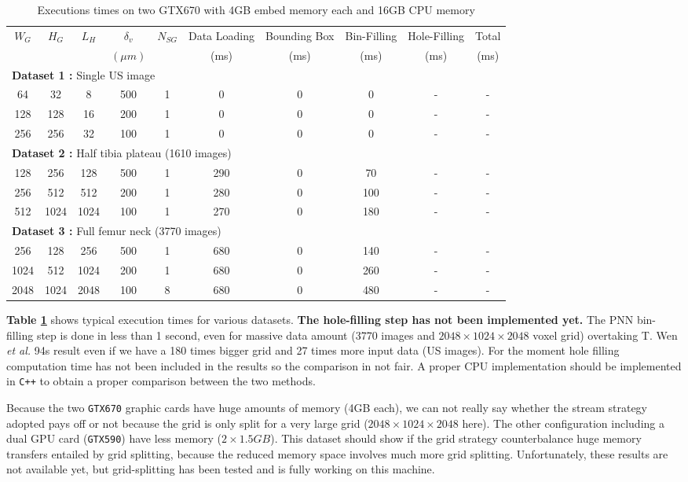 \documentclass[12pt,journal,compsoc]{IEEEtran}
\begin{document}
\begin{table}[!ht]
\renewcommand{\arraystretch}{1.3}
\caption{Executions times on two GTX670 with 4GB embed memory each and 16GB CPU memory}
\label{results_gtx670}
\centering
\begin{tabular}{|c|c|c||c|c||c|c|c|c||c|}
\hline
$W_G$ & $H_G$ & $L_H$ & $\delta_v$ & $N_{SG}$ & Data Loading & Bounding Box & Bin-Filling & Hole-Filling & Total \\
      &&&$(\mu m)$&&(ms)&(ms)&(ms)&(ms)&(ms)\\
\hline
\multicolumn{10}{|l|}{\textbf{Dataset 1 :} Single US image}\\
\hline
64&32&8&500&1&0&0&0&-&-\\
\hline
128&128&16&200&1&0&0&0&-&-\\
\hline
256&256&32&100&1&0&0&0&-&-\\
\hline
\hline
\multicolumn{10}{|l|}{\textbf{Dataset 2 :} Half tibia plateau (1610 images)}\\
\hline
128&256&128&500&1&290&0&70&-&-\\
\hline
256&512&512&200&1&280&0&100&-&-\\
\hline
512&1024&1024&100&1&270&0&180&-&-\\
\hline
\hline
\multicolumn{10}{|l|}{\textbf{Dataset 3 :} Full femur neck (3770 images)}\\
\hline
256&128&256&500&1&680&0&140&-&-\\
\hline
1024&512&1024&200&1&680&0&260&-&-\\
\hline
2048&1024&2048&100&8&680&0&480&-&-\\
\hline
\end{tabular}
\end{table}

\textbf{Table \ref{results_gtx670}} shows typical execution times for various datasets.
\textbf{The hole-filling step has not been implemented yet.} The PNN bin-filling step is done in less than 1 second, even for massive data amount (3770 images and $2048\times1024\times2048$ voxel grid) overtaking T. Wen \textit{et al.}\textbf{\cite{2}} 94s result even if we have a 180 times bigger grid and 27 times more input data (US images). For the moment hole filling computation time has not been included in the results so the comparison in not fair. A proper CPU implementation should be implemented in \texttt{C++} to obtain a proper comparison between the two methods.\par

Because the two \texttt{GTX670} graphic cards have huge amounts of memory (4GB each), we can not really say whether the stream strategy adopted pays off or not because the grid is only split for a very large grid ($2048\times1024\times2048$ here). 
The other configuration including a dual GPU card (\texttt{GTX590}) have less memory ($2\times1.5GB$). This dataset should show if the grid strategy counterbalance huge memory transfers entailed by grid splitting, because the reduced memory space involves much more grid splitting. Unfortunately, these results are not available yet, but grid-splitting has been tested and is fully working on this machine.
\end{document}
